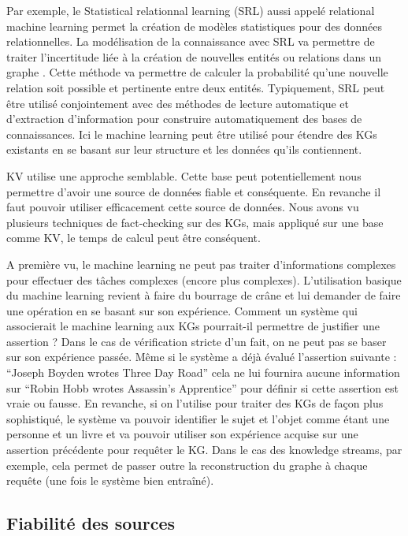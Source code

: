 Par exemple, le Statistical relationnal learning (SRL) aussi appelé relational machine learning permet la création de modèles statistiques pour des données relationnelles. La modélisation de la connaissance avec SRL va permettre de traiter l'incertitude liée à la création de nouvelles entités ou relations dans un graphe \cite{nickel2016review}. Cette méthode va permettre de calculer la probabilité qu'une nouvelle relation soit possible et pertinente entre deux entités. Typiquement, SRL peut être utilisé conjointement avec des méthodes de lecture automatique et d'extraction d'information pour construire automatiquement des bases de connaissances. Ici le machine learning peut être utilisé pour étendre des KGs existants en se basant sur leur structure et les données qu'ils contiennent.

KV utilise une approche semblable. Cette base peut potentiellement nous permettre d'avoir une source de données fiable et conséquente. En revanche il faut pouvoir utiliser efficacement cette source de données. Nous avons vu plusieurs techniques de fact-checking sur des KGs, mais appliqué sur une base comme KV, le temps de calcul peut être conséquent.

A première vu, le machine learning ne peut pas traiter d'informations complexes pour effectuer des tâches complexes (encore plus complexes). L'utilisation basique du machine learning revient à faire du bourrage de crâne et lui demander de faire une opération en se basant sur son expérience. Comment un système qui associerait le machine learning aux KGs pourrait-il permettre de justifier une assertion ? Dans le cas de vérification stricte d'un fait, on ne peut pas se baser sur son expérience passée. Même si le système a déjà évalué l'assertion suivante : \enquote{Joseph Boyden wrotes Three Day Road} cela ne lui fournira aucune information sur \enquote{Robin Hobb wrotes Assassin's Apprentice} pour définir si cette assertion est vraie ou fausse. En revanche, si on l'utilise pour traiter des KGs de façon plus sophistiqué, le système va pouvoir identifier le sujet et l'objet comme étant une personne et un livre et va pouvoir utiliser son expérience acquise sur une assertion précédente pour requêter le KG. Dans le cas des knowledge streams, par exemple, cela permet de passer outre la reconstruction du graphe à chaque requête (une fois le système bien entraîné).

\subsection{Fiabilité des sources}

